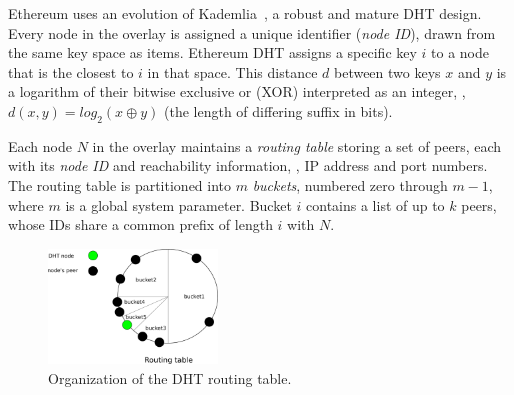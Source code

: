 Ethereum uses an evolution of Kademlia~\cite{maymounkov2002kademlia}, a robust and mature DHT design. %
Every node in the overlay is assigned a unique identifier (\emph{node ID}), drawn from the same key space as items.
Ethereum DHT assigns a specific key $i$ to a node that is the closest to $i$ in that space.
This distance $d$ between two keys $x$ and $y$ is a logarithm of their bitwise exclusive or (XOR) interpreted as an integer, \ie, $d(x,y) = \textit{log}_2(x \oplus y)$ (\ie the length of differing suffix in bits).

Each node $N$ in the overlay maintains a \emph{routing table} storing a set of peers, each with its \emph{node ID} and reachability information, \ie, IP address and port numbers.
The routing table is partitioned into $m$ \textit{buckets}, numbered zero through $m-1$, where $m$ is a global system parameter.
Bucket $i$ contains a list of up to $k$ peers, whose IDs share a common prefix of length $i$ with $N$.


\begin{figure}
    \includegraphics[width=0.4\textwidth]{img/kademlia}
    \caption{Organization of the DHT routing table.
    \protect{}}
    \label{fig:kademlia}
 \end{figure}

